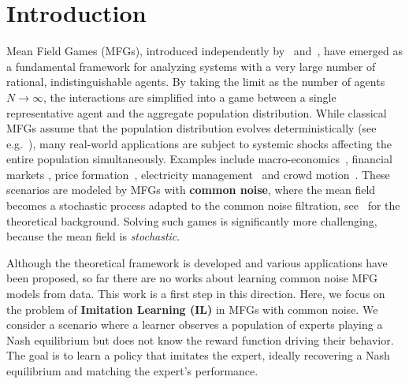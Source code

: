 \documentclass{article}
\newcommand{\defi}[1]{{\bf #1}}
\theoremstyle{plain}
\begin{document}
\begin{abstract}

\end{abstract}


\section{Introduction}


Mean Field Games (MFGs), introduced independently by~\citep{MR2295621} and~\citep{MR2346927}, have emerged as a fundamental framework for analyzing systems with a very large number of rational, indistinguishable agents. By taking the limit as the number of agents $N \to \infty$, the interactions are simplified into a game between a single representative agent and the aggregate population distribution. 
While classical MFGs assume that the population distribution evolves deterministically (see e.g.~\citep{MR3134900,MR3752669}), many real-world applications are subject to systemic shocks affecting the entire population simultaneously. Examples include macro-economics~\cite{lasry2008application,gueant2010mean,vu2025heterogenous}, financial markets \cite{carmona2015mean,carmona2017mean,firoozi2018mean,fu2021mean,burzoni2023mean,bassou2024mean}, price formation~\cite{graber2016linear,gomes2023machine},  electricity management~\cite{alasseur2020extended,lavigne2023decarbonization,escribe2024mean,dumitrescu2024energy} and crowd motion~\cite{achdou2018mean,perrin2020fictitious}. These scenarios are modeled by MFGs with \defi{common noise}, where the mean field becomes a stochastic process adapted to the common noise filtration, see~\citep{carmona2016mean,MR3753660} for the theoretical background. Solving such games is significantly more challenging, because the mean field is \emph{stochastic}. 

Although the theoretical framework is developed and various applications have been proposed, so far there are no works about learning common noise MFG models from data. This work is a first step in this direction. Here, we focus on the problem of \defi{Imitation Learning (IL)} in MFGs with common noise. We consider a scenario where a learner observes a population of experts playing a Nash equilibrium but does not know the reward function driving their behavior. The goal is to learn a policy that imitates the expert, ideally recovering a Nash equilibrium and matching the expert's performance.
\end{document}
